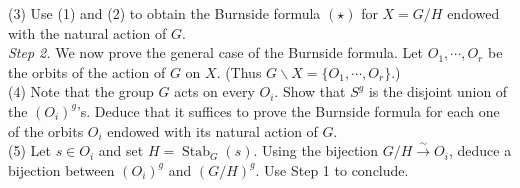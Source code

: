 \documentclass[12pt,a4paper]{article}
\begin{document}
(3) Use (1) and (2) to obtain the Burnside formula $(\star)$ for $X=G/H$
  endowed with the natural action of $G$.\\[0.6em]
\textit{Step 2.} We now prove the general case of the Burnside formula.
Let $O_1,\cdots,O_r$ be the orbits of the action of $G$ on $X$.
(Thus $G\backslash X=\{O_1,\cdots,O_r\}$.)\\[0.6em]
(4) Note that the group $G$ acts on every $O_i$. Show that $S^g$ is the
  disjoint union of the $(O_i)^g$'s. Deduce that it suffices to prove the
  Burnside formula for each one of the orbits $O_i$ endowed with its natural
  action of $G$.\\[0.6em]
(5) Let $s\in O_i$ and set $H=\operatorname{Stab}_G(s)$.
  Using the bijection $G/H\xrightarrow{\sim}O_i$, deduce a bijection between
  $(O_i)^g$ and $(G/H)^g$. Use Step 1 to conclude.

\newpage
\end{document}
